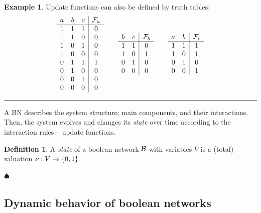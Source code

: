 \documentclass[
	digital, oneside, nosansbold, nocolorbold, nolot, nolof
]{fithesis4}
\theoremstyle{definition}
\newtheorem{definition}{Definition}
\theoremstyle{definition}
\newtheorem{example}{Example}
\newenvironment{ldefinition}
    {\begin{definition}}
	{\par\hspace{\stretch{1}}$\spadesuit$\hspace{\stretch{1}}
     \par\end{definition}}
\newenvironment{lexample}
    {\begin{example}}
    {\par\hspace{\stretch{1}}\rule{0.2\textwidth}{0.01ex}\hspace{\stretch{1}}
     \par\end{example}}
\DeclarePairedDelimiter{\set}{\{}{\}}
\begin{document}
\begin{lexample}
Update functions can also be defined by truth tables:
\[
\begin{array}{ccc|c}
    a & b & c & \mathcal{F}_a\\
    \hline
    1 & 1 & 1 & 0\\
    1 & 1 & 0 & 0\\
    1 & 0 & 1 & 0\\
    1 & 0 & 0 & 0\\
    0 & 1 & 1 & 1\\
    0 & 1 & 0 & 0\\
    0 & 0 & 1 & 0\\
    0 & 0 & 0 & 0\\
\end{array}
\qquad
\begin{array}{cc|c}
    b & c & \mathcal{F}_b\\
    \hline
    1 & 1 & 0\\
    1 & 0 & 1\\
    0 & 1 & 0\\
    0 & 0 & 0\\
\end{array}
\qquad
\begin{array}{cc|c}
    a & b & \mathcal{F}_c\\
    \hline
    1 & 1 & 1\\
    1 & 0 & 1\\
    0 & 1 & 0\\
    0 & 0 & 1\\
\end{array}
\]
\end{lexample}

A BN describes the system structure: main components, and their interactions.
Then, the system evolves and changes its \emph{state} over time according to the
interaction rules -- update functions.

\begin{ldefinition}
A \emph{state} of a boolean network $\mathcal{B}$ with variables $V$ is a
(total) valuation $\nu : V \to \set{0, 1}$.
\end{ldefinition}

\subsection{Dynamic behavior of boolean networks}
\end{document}
